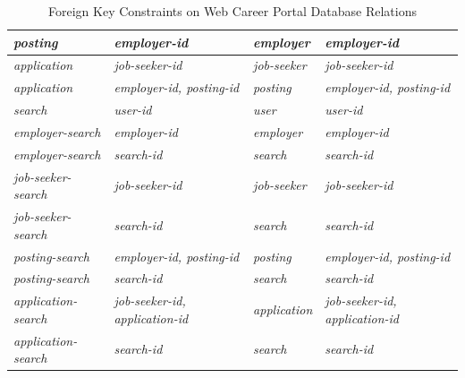 \documentclass{article}
\begin{document}
\begin{table}[h]
\begin{tabular}{|l|l|l|l|}
                    \textit{posting}              & \textit{employer-id}                   & \textit{employer}            & \textit{employer-id}                   \\ \hline
                    \textit{application}          & \textit{job-seeker-id}                 & \textit{job-seeker}          & \textit{job-seeker-id}                 \\ \hline
                    \textit{application}          & \textit{employer-id, posting-id}       & \textit{posting}             & \textit{employer-id, posting-id}       \\ \hline
                    \textit{search}               & \textit{user-id}                       & \textit{user}                & \textit{user-id}                       \\ \hline
                    \textit{employer-search}      & \textit{employer-id}                   & \textit{employer}            & \textit{employer-id}                   \\ \hline
                    \textit{employer-search}      & \textit{search-id}                     & \textit{search}              & \textit{search-id}                     \\ \hline
                    \textit{job-seeker-search}    & \textit{job-seeker-id}                 & \textit{job-seeker}          & \textit{job-seeker-id}                 \\ \hline
                    \textit{job-seeker-search}    & \textit{search-id}                     & \textit{search}              & \textit{search-id}                     \\ \hline
                    \textit{posting-search}       & \textit{employer-id, posting-id}       & \textit{posting}             & \textit{employer-id, posting-id}       \\ \hline
                    \textit{posting-search}       & \textit{search-id}                     & \textit{search}              & \textit{search-id}                     \\ \hline
                    \textit{application-search}   & \textit{job-seeker-id, application-id} & \textit{application}         & \textit{job-seeker-id, application-id} \\ \hline
                    \textit{application-search}   & \textit{search-id}                     & \textit{search}              & \textit{search-id}                     \\ \hline
                \end{tabular}
                \caption{Foreign Key Constraints on Web Career Portal Database Relations}
                \label{tab:foreign_keys}
            \end{table}
\end{document}
